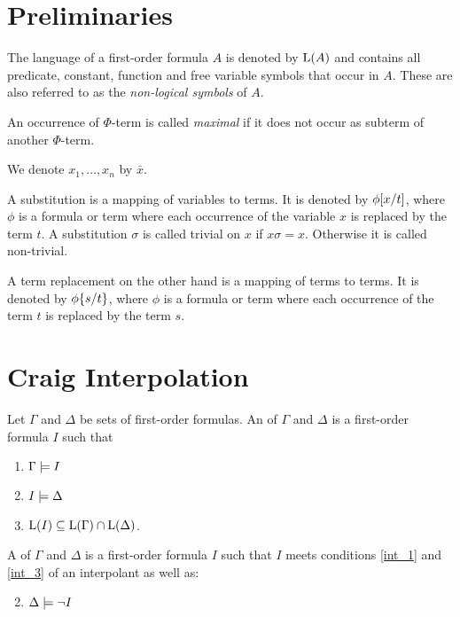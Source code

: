 \section{Preliminaries}

The language of a first-order formula $A$ is denoted by $\operatorname{L}(A)$ and contains all predicate, constant, function and free variable symbols that occur in $A$.
These are also referred to as the \emph{non-logical symbols} of $A$.

An occurrence of $\Phi$-term is called \emph{maximal} if it does not occur as subterm of another $\Phi$-term.

We denote $x_1, \ldots, x_n$ by $\bar x$.

A substitution is a mapping of variables to terms. It is denoted by $\phi[x/t]$, where $\phi$ is a formula or term where each occurrence of the variable $x$ is replaced by the term $t$.
A substitution $\sigma$ is called trivial on $x$ if $x\sigma = x$. Otherwise it is called non-trivial.

A term replacement on the other hand is a mapping of terms to terms. It is denoted by $\phi\{s/t\}$, where $\phi$ is a formula or term where each occurrence of the term $t$ is replaced by the term $s$.

\section{Craig Interpolation}


\begin{defi}
	\label{def:interpolant}
	Let $\Gamma$ and $\Delta$ be sets of first-order formulas.
	An  of $\Gamma$ and $\Delta$ is a first-order formula $I$ such that 
	\begin{enumerate}
		\item $ \Gamma \models I$ \label{int_1}
		\item $ I \models \Delta $  \label{int_2}
		\item $ \operatorname{L}(I) \subseteq \operatorname{L}(\Gamma) \cap \operatorname{L}(\Delta)$.  \label{int_3}
	\end{enumerate}

	\begin{samepage}
		A  of $\Gamma$ and $\Delta$ is a first-order formula $I$ such that $I$ meets conditions \ref{int_1} and \ref{int_3} of an interpolant as well as:
		\begin{enumerate}[\quad\:1'.]
				\setcounter{enumi}{1}
			\item $ \Delta \models \lnot I $  \label{int_2prime}
				\qedhere
		\end{enumerate}
	\end{samepage}
\end{defi}

